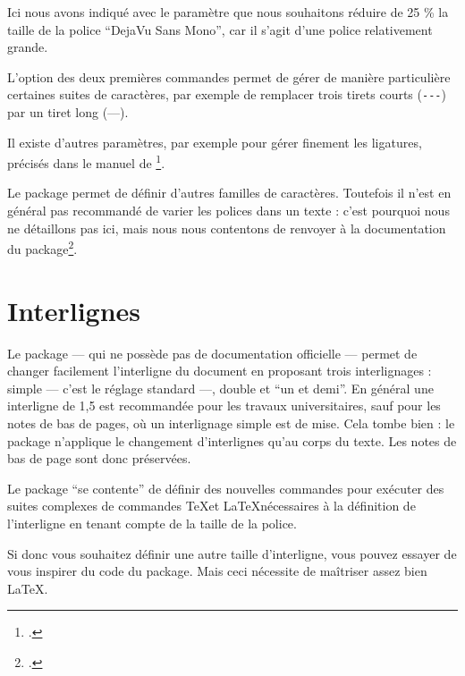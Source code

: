 Ici nous avons indiqué avec le paramètre  que nous souhaitons réduire de 25 \% la taille de la police \enquote{DejaVu Sans Mono}, car il s'agit d'une police relativement grande. 

L'option  des deux premières commandes permet de gérer de manière particulière certaines suites de caractères, par exemple de remplacer trois tirets courts (\verb|---|) par un tiret long (---). 

Il existe d'autres paramètres, par exemple pour gérer finement les ligatures, précisés dans le manuel de \footcite{fontspec_optionspolices}.

\begin{plusloins}
Le package  permet de définir d'autres familles de caractères. Toutefois  il n'est en général pas recommandé de varier les polices dans un texte : c'est pourquoi nous ne détaillons pas ici, mais nous  nous contentons de renvoyer à la documentation du package\footcite{fontspec_nouvellefamille}.
\end{plusloins}

\section{Interlignes}\label{interligne}

Le package  --- qui ne possède pas de documentation officielle --- permet de changer facilement l'interligne du document en proposant trois interlignages : simple --- c'est le réglage standard ---, double et \enquote{un et demi}. En général une interligne de 1,5 est recommandée pour les travaux universitaires, sauf pour les notes de bas de pages, où un interlignage simple est de mise. Cela tombe bien : le package n'applique le changement d'interlignes qu'au corps du texte. Les notes de bas de page sont donc préservées.

\begin{plusloins}
Le package   \enquote{se contente} de définir des nouvelles commandes pour exécuter des suites complexes de commandes \TeX et \LaTeX nécessaires à la définition de l'interligne en tenant compte de la taille de la police.

Si donc vous souhaitez définir une autre taille d'interligne, vous pouvez essayer de vous inspirer du code du package. Mais ceci nécessite de maîtriser assez bien \LaTeX. 
\end{plusloins}

